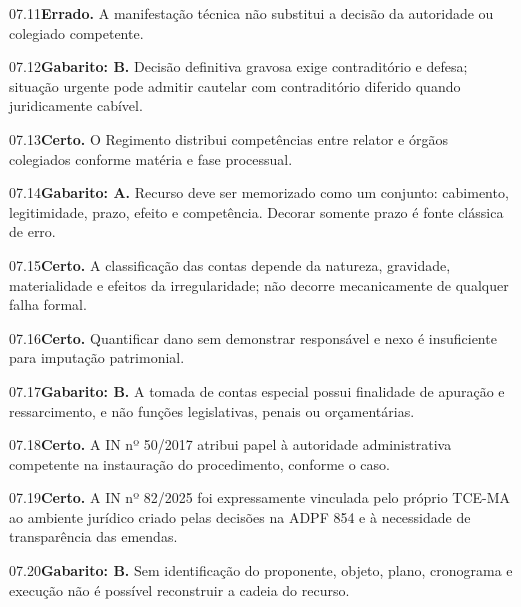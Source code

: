 \begin{solucao}{07.11}\textbf{Errado.} A manifestação técnica não substitui a decisão da autoridade ou colegiado competente.\end{solucao}
\begin{solucao}{07.12}\textbf{Gabarito: B.} Decisão definitiva gravosa exige contraditório e defesa; situação urgente pode admitir cautelar com contraditório diferido quando juridicamente cabível.\end{solucao}
\begin{solucao}{07.13}\textbf{Certo.} O Regimento distribui competências entre relator e órgãos colegiados conforme matéria e fase processual.\end{solucao}
\begin{solucao}{07.14}\textbf{Gabarito: A.} Recurso deve ser memorizado como um conjunto: cabimento, legitimidade, prazo, efeito e competência. Decorar somente prazo é fonte clássica de erro.\end{solucao}
\begin{solucao}{07.15}\textbf{Certo.} A classificação das contas depende da natureza, gravidade, materialidade e efeitos da irregularidade; não decorre mecanicamente de qualquer falha formal.\end{solucao}
\begin{solucao}{07.16}\textbf{Certo.} Quantificar dano sem demonstrar responsável e nexo é insuficiente para imputação patrimonial.\end{solucao}
\begin{solucao}{07.17}\textbf{Gabarito: B.} A tomada de contas especial possui finalidade de apuração e ressarcimento, e não funções legislativas, penais ou orçamentárias.\end{solucao}
\begin{solucao}{07.18}\textbf{Certo.} A IN nº 50/2017 atribui papel à autoridade administrativa competente na instauração do procedimento, conforme o caso.\end{solucao}
\begin{solucao}{07.19}\textbf{Certo.} A IN nº 82/2025 foi expressamente vinculada pelo próprio TCE-MA ao ambiente jurídico criado pelas decisões na ADPF 854 e à necessidade de transparência das emendas.\end{solucao}
\begin{solucao}{07.20}\textbf{Gabarito: B.} Sem identificação do proponente, objeto, plano, cronograma e execução não é possível reconstruir a cadeia do recurso.\end{solucao}
